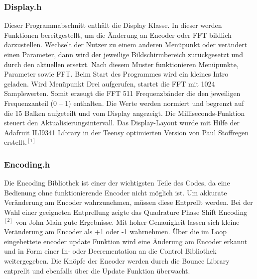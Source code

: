 \documentclass[12pt]{article}
\begin{document}
\subsubsection{Display.h}
Dieser Programmabschnitt enthält die Display Klasse. In dieser werden Funktionen bereitgestellt, um die Änderung an Encoder oder FFT bildlich darzustellen.  
Wechselt der Nutzer zu einem anderen Menüpunkt oder verändert einen Parameter, dann wird der jeweilige Bildschirmbereich zurückgesetzt und durch den aktuellen ersetzt. 
Nach diesem Muster funktionieren Menüpunkte, Parameter sowie FFT. Beim Start des Programmes wird ein kleines Intro geladen.
Wird Menüpunkt Drei aufgerufen, startet die FFT mit 1024 Samplewerten. Somit erzeugt die FFT 511 Frequenzbänder die den jeweiligen Frequenzanteil (0 – 1) enthalten. 
Die Werte werden normiert und begrenzt auf die 15 Balken aufgeteilt und vom Display angezeigt. 
Die Milliseconds-Funktion steuert den Aktualisierungsintervall.  
Das Display-Layout wurde mit Hilfe der Adafruit ILI9341 Library in der Teensy optimierten Version von Paul Stoffregen erstellt.$^{[1]}$
\subsubsection{Encoding.h}
Die Encoding Bibliothek ist einer der wichtigsten Teile des Codes, da eine Bedienung ohne funktionierende Encoder nicht möglich ist. Um akkurate Veränderung am Encoder wahrzunehmen, 
müssen diese Entprellt werden. Bei der Wahl einer geeigneten Entprellung zeigte das Quadrature Phase Shift Encoding$^{[2]}$ von John Main gute Ergebnisse. Mit hoher Genauigkeit lassen sich 
kleine Veränderung am Encoder als +1 oder -1 wahrnehmen. Über die im Loop eingebettete encoder update Funktion wird eine Änderung am Encoder erkannt und in Form einer In- oder Decrementation an die Control 
Bibliothek weitergegeben. Die Knöpfe der Encoder werden durch die Bounce Library entprellt und ebenfalls über die Update Funktion überwacht.   
\newpage
\end{document}
